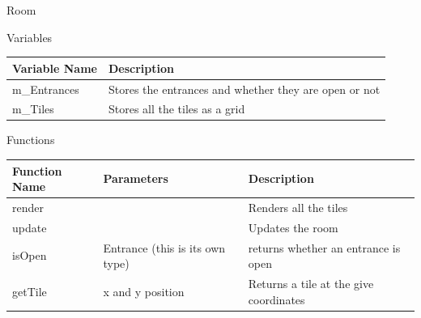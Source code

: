 \documentclass{article}
\begin{document}
                Room
                \begin{center}
                    Variables
                    \begin{tabular}{ | m{} | m{} | }
                        \hline
                        \textbf{Variable Name} & \textbf{Description} \\
                        \hline
                        m\_Entrances & Stores the entrances and whether they are open or not\\
                        \hline
                        m\_Tiles & Stores all the tiles as a grid \\
                        \hline
                    \end{tabular}
                    Functions
                    \begin{tabular}{ | m{} | m{}| m{} | }
                        \hline
                        \textbf{Function Name} & \textbf{Parameters} & \textbf{Description} \\
                        \hline
                        render & & Renders all the tiles \\
                        \hline
                        update & & Updates the room \\
                        \hline
                        isOpen & Entrance (this is its own type) & returns whether an entrance is open \\
                        \hline
                        getTile & x and y position & Returns a tile at the give coordinates \\
                        \hline
                    \end{tabular}
                \end{center}
            \clearpage
\end{document}
